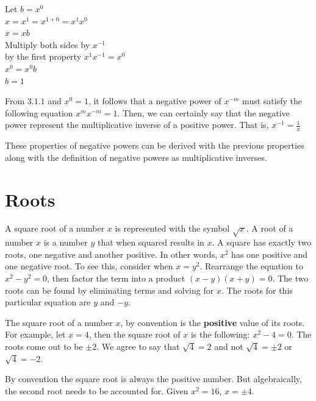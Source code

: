 \documentclass[12pt]{report}
\begin{document}
\noindent Let $b=x^0$\smallskip\\
$x=x^1=x^{1+0}=x^{1}x^{0}$\\
$x=xb$\\
Multiply both sides by $x^{-1}$\\
by the first property $x^1x^{-1}=x^0$\\
$x^0=x^0b$\\
$b=1$

From $3.1.1$ and $x^0=1$, it follows that a negative power of $x^{-m}$ must satisfy the following equation $x^m x^{-m}=1$. Then, we can certainly say that the negative power represent the multiplicative inverse of a positive power. That is, $x^{-1}=\frac{1}{x}$\medskip

These properties of negative powers can be derived with the previous properties along with the definition of negative powers as multiplicative inverses.

\section{Roots}

\hspace{\parindent}A square root of a number $x$ is represented with the symbol $\sqrt{x}$. A root of a number $x$ is a number $y$ that when squared results in $x$. A square has exactly two roots, one negative and another positive. In other words, $x^2$ has one positive and one negative root. To see this, consider when $x=y^2$. Rearrange the equation to $x^2-y^2=0$, then factor the term into a product $(x-y)(x+y)=0$. The two roots can be found by eliminating terms and solving for $x$. The roots for this particular equation are $y$ and $-y$.

The square root of a number $x$, by convention is the \textbf{positive} value of its roots. For example, let $x=4$, then the square root of $x$ is the following: $x^2-4=0$. The roots come out to be $\pm 2$. We agree to say that $\sqrt{4}=2$ and not $\sqrt{4}=\pm 2$ or $\sqrt{4}=-2$.

By convention the square root is always the positive number. But algebraically, the second root needs to be accounted for. Given $x^2=16$, $x=\pm 4$.\bigskip\\
\end{document}

